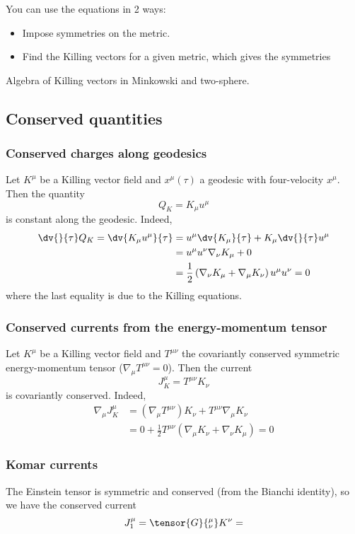 You can use the equations in 2 ways:
\begin{itemize}
\item Impose symmetries on the metric.
\item Find the Killing vectors for a given metric, which gives the symmetries
\end{itemize}

\begin{example}
Algebra of Killing vectors in Minkowski and two-sphere.
\end{example}

\subsection{Conserved quantities}
\subsubsection{Conserved charges along geodesics}
Let $K^\mu$ be a Killing vector field and $x^\mu(\tau)$ a geodesic with four-velocity $x^\mu$. Then the quantity
\[ Q_K = K_\mu u^\mu \]
is constant along the geodesic. Indeed,
\begin{align*}
\dv{}{\tau}Q_K = \dv{K_\mu u^\mu}{\tau} &= u^\mu \dv{K_\mu}{\tau} + K_\mu \dv{}{\tau}u^\mu \\
&= u^\mu u^\nu \nabla_\nu K_\mu + 0\\
&= \frac{1}{2}\left(\nabla_\nu K_\mu + \nabla_\mu K_\nu\right)u^\mu u^\nu = 0
\end{align*}
where the last equality is due to the Killing equations.

\subsubsection{Conserved currents from the energy-momentum tensor}
Let $K^\mu$ be a Killing vector field and $T^{\mu\nu}$ the covariantly conserved symmetric energy-momentum tensor ($\nabla_\mu T^{\mu\nu} = 0$). Then the current
\[ J_K^\mu = T^{\mu\nu}K_\nu \]
is covariantly conserved. Indeed,
\begin{align*}
\nabla_\mu J^\mu_K &= (\nabla_\mu T^{\mu\nu})K_\nu + T^{\mu\nu} \nabla_\mu K_\nu \\
&= 0 + \frac{1}{2}T^{\mu\nu}\left(\nabla_\mu K_\nu + \nabla_\nu K_\mu\right) = 0
\end{align*}

\subsubsection{Komar currents}
The Einstein tensor is symmetric and conserved (from the Bianchi identity), so we have the conserved current
\[ J^\mu_1 = \tensor{G}{^\mu_\nu}K^\nu =  \]

